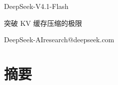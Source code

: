 \documentclass[
  10
]{article}
\author{}
\date{}
\begin{document}
\renewcommand{\figurename}{图}
\renewcommand{\tablename}{表}




\begin{center}
{\LARGE DeepSeek-V4.1-Flash\par}
\vspace{0.5em}
{\large 突破 KV 缓存压缩的极限\par}
\vspace{0.8em}
{\normalsize DeepSeek-AI\quad research@deepseek.com\par}
\end{center}
\label{deepseek-v4.1-flash-pushing-the-limits-of-kv-cache-compression}

\section*{摘要}\label{abstract}
\end{document}
